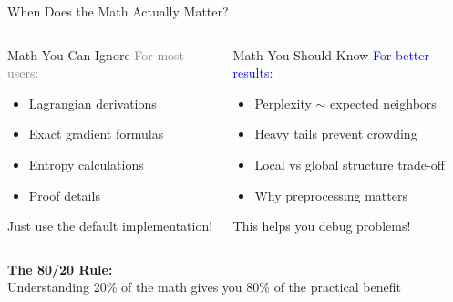 \documentclass[aspectratio=169]{beamer}
\begin{document}
\begin{frame}{When Does the Math Actually Matter?}
\begin{columns}
\begin{block}{Math You Can Ignore}
\textcolor{gray}{For most users:}
\begin{itemize}
\item Lagrangian derivations
\item Exact gradient formulas
\item Entropy calculations
\item Proof details
\end{itemize}

\vspace{3mm}
Just use the default implementation!
\end{block}

\begin{block}{Math You Should Know}
\textcolor{blue}{For better results:}
\begin{itemize}
\item Perplexity $\sim$ expected neighbors
\item Heavy tails prevent crowding
\item Local vs global structure trade-off
\item Why preprocessing matters
\end{itemize}

\vspace{3mm}
This helps you debug problems!
\end{block}
\end{columns}

\vspace{5mm}
\begin{center}
\colorbox{green!20}{\parbox{0.85\textwidth}{\centering
\textbf{The 80/20 Rule:}\\
Understanding 20\% of the math gives you 80\% of the practical benefit}}
\end{center}
\end{frame}
\end{document}
